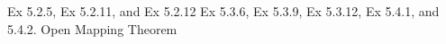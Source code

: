 \documentclass[12pt]{article}
\begin{document}


Ex 5.2.5, Ex 5.2.11, and Ex 5.2.12
Ex 5.3.6, Ex 5.3.9, Ex 5.3.12, Ex 5.4.1, and 5.4.2.
Open Mapping Theorem
\end{document}
